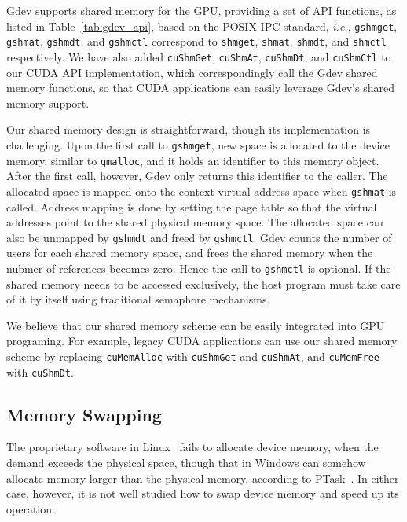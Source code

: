 Gdev supports shared memory for the GPU, providing a set of API
functions, as listed in Table~\ref{tab:gdev_api}, based on the POSIX IPC
standard, \textit{i.e.}, \texttt{gshmget}, \texttt{gshmat},
\texttt{gshmdt}, and \texttt{gshmctl} correspond to \texttt{shmget},
\texttt{shmat}, \texttt{shmdt}, and \texttt{shmctl} respectively.
We have also added \texttt{cuShmGet}, \texttt{cuShmAt},
\texttt{cuShmDt}, and \texttt{cuShmCtl} to our CUDA API 
implementation, which correspondingly call the Gdev shared memory
functions, so that CUDA applications can easily leverage Gdev's shared
memory support.

Our shared memory design is straightforward, though its implementation
is challenging.
Upon the first call to \texttt{gshmget}, new space is allocated to the
device memory, similar to \texttt{gmalloc}, and it holds an identifier
to this memory object. 
After the first call, however, Gdev only returns this identifier to the
caller.
The allocated space is mapped onto the context virtual address space
when \texttt{gshmat} is called.
Address mapping is done by setting the page table so that the virtual
addresses point to the shared physical memory space.
The allocated space can also be unmapped by \texttt{gshmdt} and freed by
\texttt{gshmctl}. 
Gdev counts the number of users for each shared memory space,
and frees the shared memory when the nubmer of references becomes zero.
Hence the call to \texttt{gshmctl} is optional.
If the shared memory needs to be accessed exclusively, the host program
must take care of it by itself using traditional semaphore mechanisms.

We believe that our shared memory scheme can be easily integrated into
GPU programing.
For example, legacy CUDA applications can use our shared memory scheme
by replacing \texttt{cuMemAlloc} with \texttt{cuShmGet} and
\texttt{cuShmAt}, and \texttt{cuMemFree} with \texttt{cuShmDt}.

\subsection{Memory Swapping}
\label{sec:memory_swapping}

The proprietary software in Linux~\cite{CUDA40} fails to allocate
device memory, when the demand exceeds the physical space, though
that in Windows can somehow allocate memory larger than the physical
memory, according to PTask~\cite{Rossbach_SOSP11}. 
In either case, however, it is not well studied how to swap device
memory and speed up its operation.

